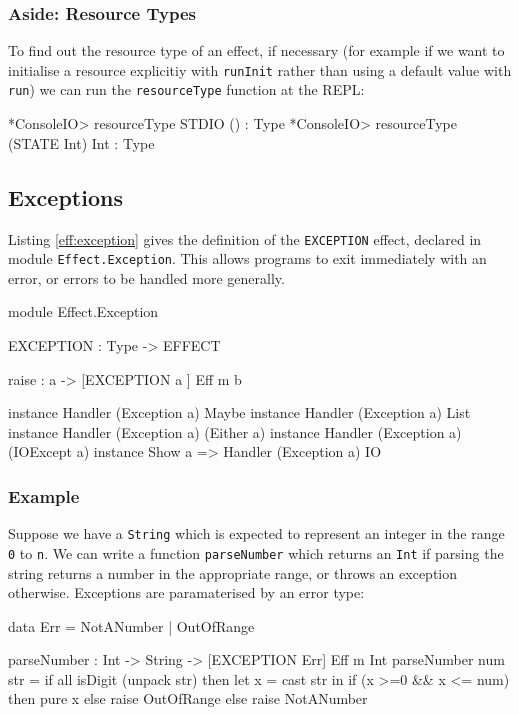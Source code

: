 \subsubsection*{Aside: Resource Types}

To find out the resource type of an effect, if necessary (for example if
we want to initialise a resource explicitiy with \texttt{runInit} rather than
using a default value with \texttt{run})
we can run the \texttt{resourceType} function at the \Idris{} REPL:

\begin{code}
*ConsoleIO> resourceType STDIO
() : Type
*ConsoleIO> resourceType (STATE Int)
Int : Type
\end{code}

\subsection{Exceptions}

Listing \ref{eff:exception} gives the definition of the \texttt{EXCEPTION}
effect, declared in module \texttt{Effect.Exception}. This allows programs
to exit immediately with an error, or errors to be handled more generally.

\begin{code}[float=h,frame=single,label=eff:exception,caption={Exception Effect}]
module Effect.Exception

EXCEPTION : Type -> EFFECT

raise : a -> { [EXCEPTION a ] } Eff m b 

instance           Handler (Exception a) Maybe
instance           Handler (Exception a) List
instance           Handler (Exception a) (Either a)
instance           Handler (Exception a) (IOExcept a)
instance Show a => Handler (Exception a) IO
\end{code}

\subsubsection*{Example}

Suppose we have a \texttt{String} which is expected to represent an integer in
the range \texttt{0} to \texttt{n}. We can write a function \texttt{parseNumber}
which returns an \texttt{Int} if parsing the string returns a number in the
appropriate range, or throws an exception otherwise. Exceptions are
paramaterised by an error type:

\begin{code}
data Err = NotANumber | OutOfRange

parseNumber : Int -> String -> { [EXCEPTION Err] } Eff m Int
parseNumber num str
   = if all isDigit (unpack str)
        then let x = cast str in
             if (x >=0 && x <= num)
                then pure x
                else raise OutOfRange
        else raise NotANumber
\end{code}


